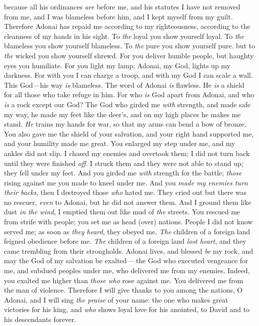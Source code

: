 \begin{biblechapter}
\verse because all his ordinances \textit{are} before me, 
and his statutes I have not removed from me,
\verse and I was blameless before him, 
and I kept myself from my guilt.
\verse Therefore Adonai has repaid me according to my righteousness, 
according to the cleanness of my hands in his sight.
\verse To \textit{the} loyal you show yourself loyal. 
To \textit{the} blameless you show yourself blameless.
\verse To \textit{the} pure you show yourself pure. 
but to \textit{the} wicked you show yourself shrewd.
\verse For you deliver humble people, 
but haughty eyes you humiliate.
\verse For you light my lamp; 
Adonai, my God, lights up my darkness.
\verse For with you I can charge a troop, 
and with my God I can scale a wall.
\verse This God—his way \textit{is} blameless. 
The word of Adonai \textit{is} flawless. 
He \textit{is} a shield for all those who take refuge in him.
\verse For who \textit{is} God apart from Adonai, 
and who \textit{is} a rock except our God?
\verse The God who girded me \textit{with} strength, 
and made safe my way,
\verse he made my feet like the deer’s, 
and on my high places he makes me stand.
\verse \textit{He} trains my hands for war, 
so that my arms can bend a bow of bronze.
\verse You also gave me the shield of your salvation, 
and your right hand supported me, 
and your humility made me great.
\verse You enlarged my step under me, 
and my ankles did not slip.
\verse I chased my enemies and overtook them; 
I did not turn back until they were finished \textit{off}.
\verse I struck them and they were not able to stand up; 
they fell under my feet.
\verse And you girded me \textit{with} strength for the battle; 
\textit{those} rising against me you made to kneel under me.
\verse And you \textit{made my enemies turn their backs}, 
then I destroyed those \textit{who} hated me.
\verse They cried out but there was no rescuer, 
\textit{even} to Adonai, but he did not answer them.
\verse And I ground them like dust \textit{in the wind}, 
I emptied them out like mud of \textit{the} streets.
\verse You rescued me from strife with people; 
you set me as head (over) nations. 
People I did not know served me;
\verse as soon as \textit{they heard}, they obeyed me. 
\textit{The} children of a foreign land feigned obedience before me.
\verse \textit{The} children of a foreign land \textit{lost heart}, 
and they came trembling from their strongholds.
\verse Adonai lives, and blessed \textit{be} my rock, 
and may the God of my salvation be exalted—
\verse the God who executed vengeance for me, 
and subdued peoples under me,
\verse who delivered me from my enemies. 
Indeed, you exalted me higher than \textit{those who} rose against me. 
You delivered me from the man of violence.
\verse Therefore I will give thanks to you among the nations, O Adonai, 
and I will sing \textit{the praise} of your name:
\verse the one who makes great victories for his king, 
and \textit{who} shows loyal love for his anointed, 
to David and to his descendants forever.
\end{biblechapter}

